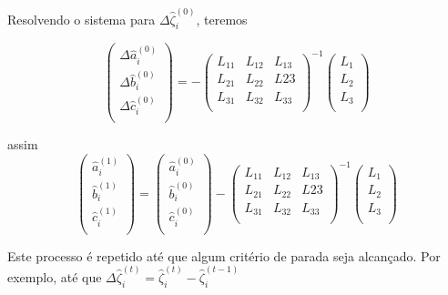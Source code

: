 	Resolvendo o sistema para $\Delta\hat{\zeta}_i^{(0)}$, teremos
	
	$$		
	\left(\begin{array}{c}
	\Delta\hat{a}_i^{(0)}\\
	\Delta\hat{b}_i^{(0)}\\
	\Delta\hat{c}_i^{(0)}\\
	\end{array}\right) =  
	-\left(\begin{array}{ccc}
	L_{11} & L_{12} & L_{13}\\
	L_{21} & L_{22} & L{23}\\
	L_{31} & L_{32} & L_{33}\\
	\end{array}\right)^{-1}
	\left(\begin{array}{c}
	L_1\\
	L_2\\
	L_3\\
	\end{array}\right)
	$$
	
	assim\\
	$$		
	\left(\begin{array}{c}
	\hat{a}_i^{(1)}\\
	\hat{b}_i^{(1)}\\
	\hat{c}_i^{(1)}\\
	\end{array}\right) = 	
	\left(\begin{array}{c}
	\hat{a}_i^{(0)}\\
	\hat{b}_i^{(0)}\\
	\hat{c}_i^{(0)}\\
	\end{array}\right) 
	-\left(\begin{array}{ccc}
	L_{11} & L_{12} & L_{13}\\
	L_{21} & L_{22} & L{23}\\
	L_{31} & L_{32} & L_{33}\\
	\end{array}\right)^{-1}
	\left(\begin{array}{c}
	L_1\\
	L_2\\
	L_3\\
	\end{array}\right)
	$$
	
	Este processo é repetido até que algum critério de parada seja alcançado. Por exemplo, até que
	$\Delta\hat{\zeta}_i^{(t)} = \hat{\zeta}_i^{(t)} - \hat{\zeta}_i^{(t - 1)}$
	
